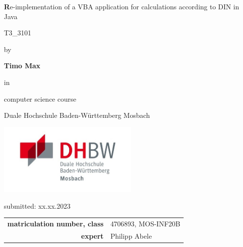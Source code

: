 
\def\title{Re-implementation of a VBA application for calculations according to DIN in Java}
\def\abgabe{xx.xx.2023}

\begin{titlepage}
	
	
	
	\vspace{5pt}
	
	\begin{center}
		
		\Large \textbf\title
		
		\vspace{50pt}
		
		\large T3\_3101
		
		by 
		
		\large \textbf{Timo Max} 
		
		\vspace{15pt}
		
		in 
		
		\large computer science course
		
		Duale Hochschule Baden-Württemberg Mosbach

        \vspace{10pt}

        \includegraphics[height=3.5cm]{images/dhbw-logo.jpg}
		
		\vspace{20pt}
		
		\large submitted: \abgabe
		
		\vspace{30pt}

		
		\begin{table}[h]
			\centering
			\begin{tabular}{r l}
				\large\textbf{matriculation number, class} & \large 4706893, MOS-INF20B \\
                \large\textbf{expert} & \large Philipp Abele \\
			\end{tabular}
			
		\end{table}
		
	\end{center}
	
	
\end{titlepage}